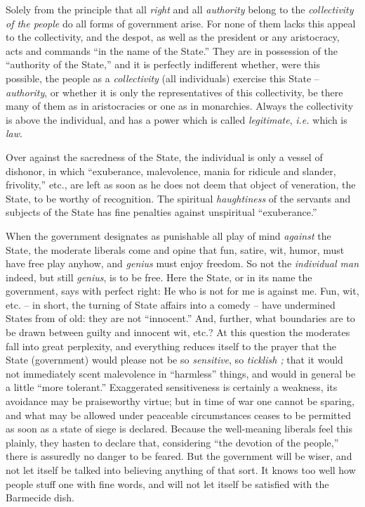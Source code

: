 Solely from the principle that all \textit{right} and all \textit{authority} 
belong to the \textit{collectivity of the people} do all forms of government 
arise. For none of them lacks this appeal to the collectivity, and the despot, 
as well as the president or any aristocracy, acts and commands ``in the name 
of the State.'' They are in possession of the ``authority of the State,'' 
and it is perfectly indifferent whether, were this possible, the people as a 
\textit{collectivity} (all individuals) exercise this State -- 
\textit{authority}, or whether it is only the representatives of this 
collectivity, be there many of them as in aristocracies or one as in 
monarchies. Always the collectivity is above the individual, and has a power 
which is called \textit{legitimate}, \textit{i.e.} which is \textit{law}.

Over against the sacredness of the State, the individual is only a vessel of 
dishonor, in which ``exuberance, malevolence, mania for ridicule and slander, 
frivolity,'' etc., are left as soon as he does not deem that object of 
veneration, the State, to be worthy of recognition. The spiritual 
\textit{haughtiness} of the servants and subjects of the State has fine 
penalties against unspiritual ``exuberance.''

When the government designates as punishable all play of mind \textit{against} 
the State, the moderate liberals come and opine that fun, satire, wit, humor, 
must have free play anyhow, and \textit{genius} must enjoy freedom. So not the 
\textit{individual man} indeed, but still \textit{genius}, is to be free. Here 
the State, or in its name the government, says with perfect right: He who is 
not for me is against me. Fun, wit, etc. -- in short, the turning of State 
affairs into a comedy -- have undermined States from of old: they are not 
``innocent.'' And, further, what boundaries are to be drawn between guilty 
and innocent wit, etc.? At this question the moderates fall into great 
perplexity, and everything reduces itself to the prayer that the State 
(government) would please not be so \textit{sensitive}, so \textit{ticklish ;} 
that it would not immediately scent malevolence in ``harmless'' things, and 
would in general be a little ``more tolerant.'' Exaggerated sensitiveness is 
certainly a weakness, its avoidance may be praiseworthy virtue; but in time of 
war one cannot be sparing, and what may be allowed under peaceable 
circumstances ceases to be permitted as soon as a state of siege is declared. 
Because the well-meaning liberals feel this plainly, they hasten to declare 
that, considering ``the devotion of the people,'' there is assuredly no 
danger to be feared. But the government will be wiser, and not let itself be 
talked into believing anything of that sort. It knows too well how people 
stuff one with fine words, and will not let itself be satisfied with the 
Barmecide dish.


